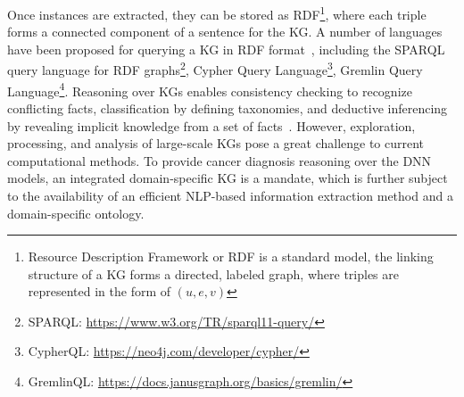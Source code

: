 \hspace*{3.5mm} Once instances are extracted, they can be stored as RDF\footnote{Resource Description Framework or RDF is a standard model, the linking structure of a KG forms a directed, labeled graph, where triples are represented in the form of $(u,e,v)$}, where each triple forms a connected component of a sentence for the KG. A number of languages have been proposed for querying a KG in RDF format~\cite{hogan2020knowledge}, including the SPARQL query language for RDF graphs\footnote{SPARQL: \url{https://www.w3.org/TR/sparql11-query/}}, Cypher Query Language\footnote{CypherQL: \url{https://neo4j.com/developer/cypher/}}, Gremlin Query Language\footnote{GremlinQL: \url{https://docs.janusgraph.org/basics/gremlin/}}.
Reasoning over KGs enables consistency checking to recognize conflicting facts, classification by defining taxonomies, and deductive inferencing by revealing implicit knowledge from a set of facts~\cite{futia2020integration}. However, exploration, processing, and analysis of large-scale KGs pose a great challenge to current computational methods. To provide cancer diagnosis reasoning over the DNN models, an integrated domain-specific KG is a mandate, which is further subject to the availability of an efficient NLP-based information extraction method and a domain-specific ontology. %

